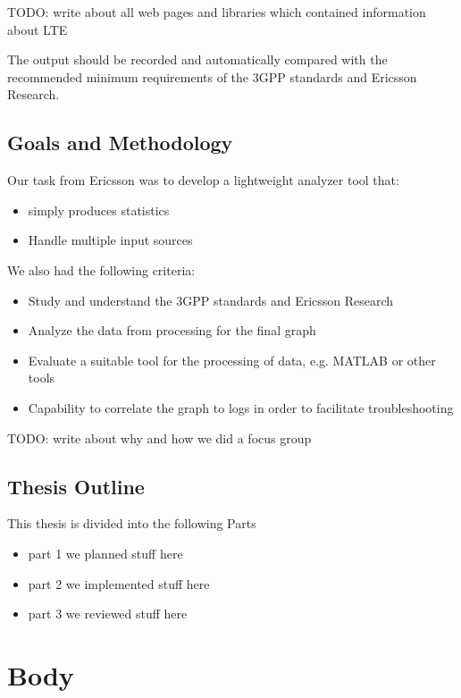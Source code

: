 \documentclass[cropmarks, frame, english]{idamasterthesis}
\begin{document}
 


TODO: write about all web pages and libraries which contained information about LTE


The output should be recorded and automatically compared with the recommended minimum requirements of the 3GPP standards and Ericsson Research.

\section{Goals and Methodology}

Our task from Ericsson was to develop a lightweight analyzer tool that:

 \begin{itemize} 
 \item simply produces statistics
 \item Handle multiple input sources
 \end{itemize} 

\setlength{\parindent}{0cm} We also had the following criteria: 
 
  \begin{itemize} 
 \item Study and understand the 3GPP standards and Ericsson Research
 \item Analyze the data from processing for the final graph
 \item Evaluate a suitable tool for the processing of data, e.g. MATLAB or other tools
 \item Capability to correlate the graph to logs in order to facilitate troubleshooting
\end{itemize}

TODO: write about why and how we did a focus group

\section{Thesis Outline}
This thesis is divided into the following Parts
\begin{itemize}
	\item part 1 we planned stuff here
	\item part 2 we implemented stuff here
	\item part 3 we reviewed stuff here
\end{itemize}

\chapter{Body}
\end{document}
